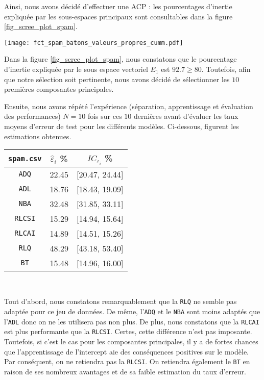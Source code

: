 \documentclass{article}
\begin{document}
\begin{multicols}{2}
Ainsi, nous avons décidé d'effectuer une ACP : les pourcentages d'inertie expliquée par les sous-espaces principaux sont consultables dans la figure \ref{fig_scree_plot_spam}.

\begingroup
   \centering
   \texttt{[image: fct\_spam\_batons\_valeurs\_propres\_cumm.pdf]}
    \label{fig_scree_plot_spam}
\endgroup

Dans la figure \ref{fig_scree_plot_spam}, nous constatons que le pourcentage d'inertie expliquée par le sous espace vectoriel $E_1$ est $92.7 \geq 80$. Toutefois, afin que notre sélection soit pertinente, nous avons décidé de sélectionner les $10$ premières composantes principales. 

Ensuite, nous avons répété l'expérience (séparation, apprentissage et évaluation des performances) $N = 10$ fois sur ces $10$ dernières avant d'évaluer les taux moyens d'erreur de test pour les différents modèles. Ci-dessous, figurent les estimations obtenues.

\begin{center}
\begin{tabular}{| c || c | c |}
\hline
\texttt{spam.csv} & $\widehat{\varepsilon}_i$ \% & $IC_{\varepsilon_{i}}$ \% \\
\hline
\hline
\texttt{ADQ} & 22.45 & [20.47, 24.44] \\
\hline
\texttt{ADL} & 18.76 & [18.43, 19.09] \\
\hline
\texttt{NBA} & 32.48 & [31.85, 33.11] \\
\hline
\texttt{RLCSI} & 15.29 & [14.94, 15.64] \\
\hline
\texttt{RLCAI} & 14.89 & [14.51, 15.26] \\
\hline
\texttt{RLQ} &  48.29 & [43.18, 53.40] \\
\hline
\texttt{BT} & 15.48 & [14.96, 16.00] \\
\hline
\end{tabular}\\ 
\end{center}

Tout d'abord, nous constatons remarquablement que la \texttt{RLQ} ne semble pas adaptée pour ce jeu de données. De même, l'\texttt{ADQ} et le \texttt{NBA} sont moins adaptés que l'\texttt{ADL} donc on ne les utilisera pas non plus. De plus, nous constatons que la \texttt{RLCAI} est plus performante que la \texttt{RLCSI}. Certes, cette différence n'est pas imposante. Toutefois, si c'est le cas pour les composantes principales, il y a de fortes chances que l'apprentissage de l'intercept aie des conséquences positives sur le modèle. Par conséquent, on ne retiendra pas la \texttt{RLCSI}. On retiendra également le \texttt{BT} en raison de ses nombreux avantages et de sa faible estimation du taux d'erreur.


\end{multicols}
\end{document}
